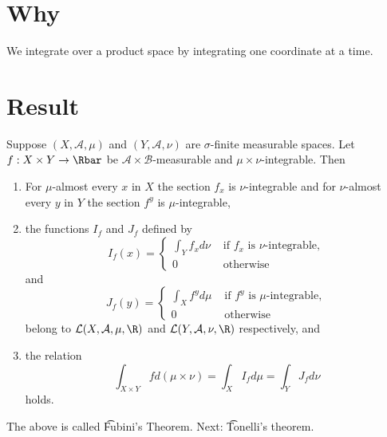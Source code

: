 
\section*{Why}

We integrate over a product space by integrating one coordinate at a time.

\section*{Result}

\begin{proposition}
Suppose $(X, \mathcal{A} , \mu )$ and $(Y, \mathcal{A} , \nu )$ are $\sigma $-finite measurable spaces.
Let $f: X \times  Y \to \Rbar$ be $\mathcal{A}  \times \mathcal{B} $-measurable and $\mu  \times  \nu $-integrable.
Then
  \begin{enumerate}
    \item For $\mu $-almost every $x$ in $X$ the section $f_x$ is $\nu $-integrable and for $\nu $-almost every $y$ in $Y$ the section $f^y$ is $\mu $-integrable,
    \item the functions $I_f$ and $J_f$ defined by
\[
I_f(x) = \begin{cases}
\int _{Y} f_x d\nu  &\text{ if }
f_x \text{ is } \nu \text{-integrable}, \\
0 & \text{ otherwise}
\end{cases}
\]
and
\[
J_f(y) = \begin{cases}
\int _{X} f^y d\mu  &\text{ if } f^y \text{ is } \mu \text{-integrable}, \\
0 & \text{ otherwise}
\end{cases}
\]
belong to $\mathcal{L} (X, \mathcal{A} , \mu , \R )$ and $\mathcal{L} (Y, \mathcal{A} , \nu , \R )$ respectively, and
      \item the relation
\[
\int _{X \times  Y} f d(\mu  \times  \nu ) = \int _{X} I_f d\mu  = \int _{Y} J_f d\nu
\]
holds.
  \end{enumerate}
\end{proposition}

The above is called \t{Fubini's Theorem}.
Next: \t{Tonelli's theorem}.

